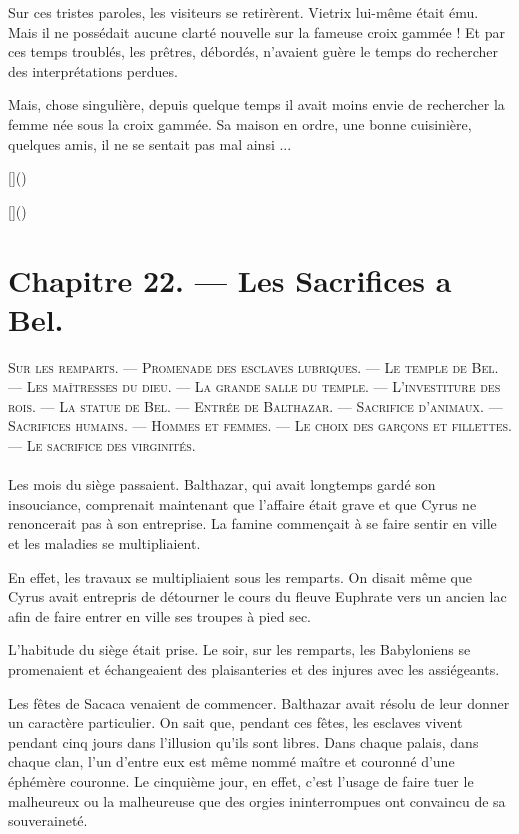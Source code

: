 \documentclass[a4paper, 11pt, oneside, polutonikogreek, french]{article}
\begin{document}
Sur ces tristes paroles, les visiteurs se retirèrent. Vietrix lui-même était ému. Mais il ne possédait aucune clarté nouvelle sur la fameuse croix gammée ! Et par ces temps troublés, les prêtres, débordés, n'avaient guère le temps do rechercher des interprétations perdues.

Mais, chose singulière, depuis quelque temps il avait moins envie de rechercher la femme née sous la croix gammée. Sa maison en ordre, une bonne cuisinière, quelques amis, il ne se sentait pas mal ainsi ...

[]()

[]()
\clearpage
\section{Chapitre 22. --- Les Sacrifices a Bel.}
\begin{center}
\scshape
\small
Sur les remparts. --- Promenade des esclaves lubriques. --- Le temple de Bel. --- Les maîtresses du dieu. --- La grande salle du temple. --- L'investiture des rois. --- La statue de Bel. --- Entrée de Balthazar. --- Sacrifice d'animaux. --- Sacrifices humains. --- Hommes et femmes. --- Le choix des garçons et fillettes. --- Le sacrifice des virginités.
\end{center}
\paragraph{}
Les mois du siège passaient. Balthazar, qui avait longtemps gardé son insouciance, comprenait maintenant que l'affaire était grave et que Cyrus ne renoncerait pas à son entreprise. La famine commençait à se faire sentir en ville et les maladies se multipliaient.

En effet, les travaux se multipliaient sous les remparts. On disait même que Cyrus avait entrepris de détourner le cours du fleuve Euphrate vers un ancien lac afin de faire entrer en ville ses troupes à pied sec.

L'habitude du siège était prise. Le soir, sur les remparts, les Babyloniens se promenaient et échangeaient des plaisanteries et des injures avec les assiégeants.

Les fêtes de Sacaca venaient de commencer. Balthazar avait résolu de leur donner un caractère particulier. On sait que, pendant ces fêtes, les esclaves vivent pendant cinq jours dans l'illusion qu'ils sont libres. Dans chaque palais, dans chaque clan, l'un d'entre eux est même nommé maître et couronné d'une éphémère couronne. Le cinquième jour, en effet, c'est l'usage de faire tuer le malheureux ou la malheureuse que des orgies ininterrompues ont convaincu de sa souveraineté.
\end{document}
